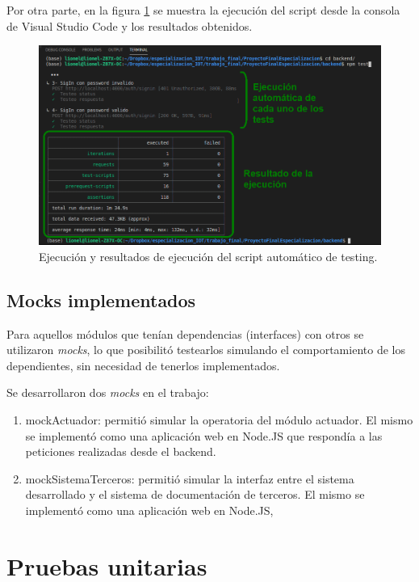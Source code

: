 Por otra parte, en la figura \ref{fig:newmanEjecucion} se muestra la ejecución del script desde la consola de Visual Studio Code y los resultados obtenidos. 


\begin{figure}[ht]
	\centering
	\includegraphics[width=1\textwidth]{./Figures/newmanEjecucion.png}
	\caption{Ejecución y resultados de ejecución del script automático de testing.}
	\label{fig:newmanEjecucion}
\end{figure}


\subsection{Mocks implementados}

Para aquellos módulos que tenían dependencias (interfaces) con otros se utilizaron \textit{mocks}, lo que posibilitó testearlos simulando el comportamiento de los dependientes, sin necesidad de tenerlos implementados.

Se desarrollaron dos \textit{mocks} en el trabajo:

\begin{enumerate}
\item mockActuador: permitió simular la operatoria del módulo actuador. El mismo se implementó como una aplicación web en Node.JS que respondía a las peticiones realizadas desde el backend.
\item mockSistemaTerceros: permitió simular la interfaz entre el sistema desarrollado y el sistema de documentación de terceros. El mismo se implementó como una aplicación web en Node.JS, 
\end{enumerate}
    
\clearpage
\section{Pruebas unitarias}

